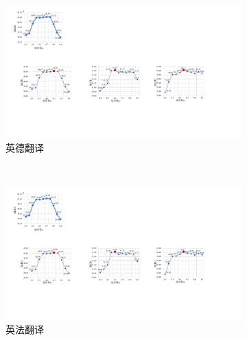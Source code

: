 

\begin{figure}[!htbp]
    \centering
    \begin{subfigure}[b]{0.5\textwidth}
      \includegraphics[width=\textwidth]{Img/fig_4_searchw_ende.pdf}
      \caption{英德翻译}
      \label{fig:4_searchw_ende}
    \end{subfigure}%
    ~%
    \begin{subfigure}[b]{0.5\textwidth}
      \includegraphics[width=\textwidth]{Img/fig_4_searchw_enfr.pdf}
      \caption{英法翻译}
      \label{fig:4_searchw_enfr}
    \end{subfigure}
    \\%
    \begin{subfigure}[b]{0.5\textwidth}

\end{subfigure}
\end{figure}
